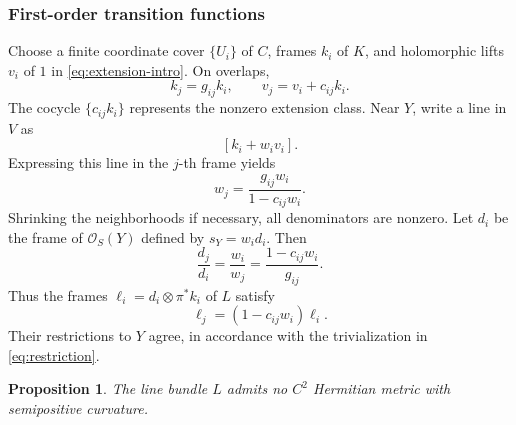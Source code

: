 \documentclass[11pt]{amsart}
\newtheorem{proposition}[theorem]{Proposition}
\theoremstyle{definition}
\theoremstyle{remark}
\numberwithin{equation}{section}
\newcommand{\OO}{\mathcal O}
\begin{document}
\subsubsection{First-order transition functions}

Choose a finite coordinate cover $\{U_i\}$ of $C$, frames $k_i$ of $K$,
and holomorphic lifts $v_i$ of $1$ in \eqref{eq:extension-intro}.
On overlaps,
\begin{equation}\label{eq:vector-transitions}
 k_j=g_{ij}k_i,\qquad v_j=v_i+c_{ij}k_i.
\end{equation}
The cocycle $\{c_{ij}k_i\}$ represents the nonzero extension class.
Near $Y$, write a line in $V$ as
\[
 [k_i+w_iv_i].
\]
Expressing this line in the $j$-th frame yields
\begin{equation}\label{eq:normal-transition}
 w_j=\frac{g_{ij}w_i}{1-c_{ij}w_i}.
\end{equation}
Shrinking the neighborhoods if necessary, all denominators are nonzero.
Let $d_i$ be the frame of $\OO_S(Y)$ defined by $s_Y=w_id_i$. Then
\[
 \frac{d_j}{d_i}=\frac{w_i}{w_j}
 =\frac{1-c_{ij}w_i}{g_{ij}}.
\]
Thus the frames $\ell_i=d_i\otimes\pi^*k_i$ of $L$ satisfy
\begin{equation}\label{eq:L-transition}
 \ell_j=(1-c_{ij}w_i)\ell_i.
\end{equation}
Their restrictions to $Y$ agree, in accordance with the trivialization
in \eqref{eq:restriction}.

\begin{proposition}\label{prop:no-metric}
The line bundle $L$ admits no $C^2$ Hermitian metric with semipositive
curvature.
\end{proposition}
\end{document}
